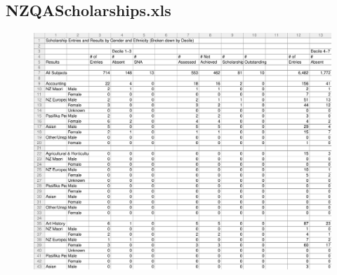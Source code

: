 \documentclass[a4paper]{article}
\begin{document}
\newpage
\subsection{NZQAScholarships.xls}
\label{sec:TCRO_NZQAScholarships.xls}
\begin{figure}[!h]
\centering
\includegraphics[width=\textwidth]{./TestCase/NZQAScholarships.pdf}
\end{figure}
\end{document}
